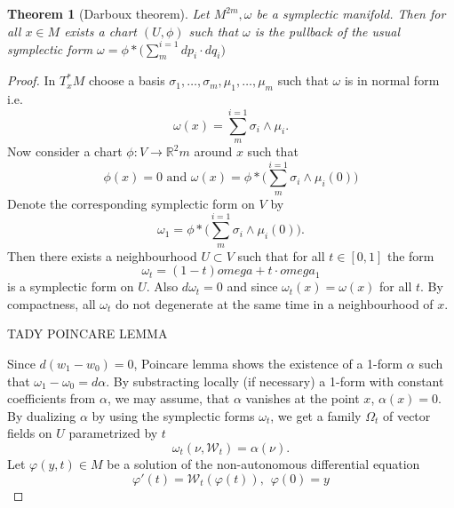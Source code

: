 \documentclass{article}
\newtheorem{theorem}{Theorem}
\theoremstyle{definition}
\begin{document}
\begin{theorem}[Darboux theorem]
    Let $M^{2m}, \omega$ be a symplectic manifold. Then for all $x \in M$ exists a chart $(U,\phi)$ such that $\omega$ is the pullback of the usual symplectic form $\omega = \phi*\Big(\sum_{m}^{i=1} dp_i \cdot dq_i \Big)$ 
\end{theorem}
\begin{proof}
    In $T^*_xM$ choose a basis $\sigma_1, \dots, \sigma_m, \mu_1, \dots, \mu_m$ such that $\omega$ is in normal form i.e.
    \begin{equation*}
        \omega(x) = \sum_{m}^{i=1} \sigma_i \wedge \mu_i.
    \end{equation*} 
    Now consider a chart $\phi : V \rightarrow \mathbb{R}^2m$ around $x$ such that 
    \begin{equation*}
        \phi(x) = 0 \text{ and } \omega(x) = \phi* \Big( \sum_{m}^{i=1} \sigma_i \wedge \mu_i(0) \Big)
    \end{equation*}
    Denote the corresponding symplectic form on $V$ by 
    \begin{equation*}
        \omega_1 = \phi* \Big( \sum_{m}^{i=1} \sigma_i \wedge \mu_i(0) \Big).
    \end{equation*}
    Then there exists a neighbourhood $U \subset V$ such that for all $t \in [0,1]$ the form 
    \begin{equation*}
        \omega_t = (1-t)omega + t\cdot omega_1
    \end{equation*}
    is a symplectic form on $U$. Also $d\omega_t = 0$ and since $\omega_t(x) = \omega(x)$ for all $t$. By compactness, all $\omega_t$ do not degenerate at the same time in a neighbourhood of $x$. 

    TADY POINCARE LEMMA 

    Since $d(w_1 - w_0) = 0$, Poincare lemma shows the existence of a 1-form $\alpha$ such that $\omega_1 - \omega_0 = d\alpha$.
    By substracting locally (if necessary) a 1-form with constant coefficients from $\alpha$, we may assume, that $\alpha$ vanishes at the point $x$, $\alpha(x) = 0$.
    By dualizing $\alpha$ by using the symplectic forms $\omega_t$, we get a family $\Omega_t$ of vector fields on $U$ parametrized by $t$
    \begin{equation*}
        \omega_t(\nu, \mathcal{W}_t) = \alpha(\nu).
    \end{equation*}
    Let $\varphi(y,t) \in M$ be a solution of the non-autonomous differential equation
    \begin{equation*}
        \varphi'(t) = \mathcal{W}_t(\varphi(t)), \hspace{5pt} \varphi(0) = y
    \end{equation*}


\end{proof}
\end{document}

